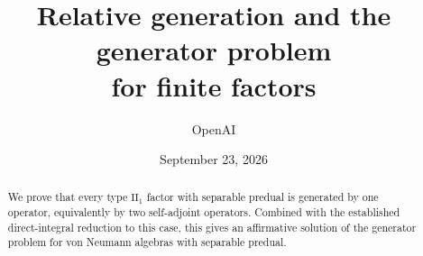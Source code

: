 \documentclass[11pt,letterpaper]{article}
\title{Relative generation and the generator problem\\for finite factors}
\author{OpenAI}
\date{September 23, 2026}
\begin{document}
\maketitle
\begin{abstract}
We prove that every type $\mathrm{II}_1$ factor with separable predual is
generated by one operator, equivalently by two self-adjoint operators.
Combined with the established direct-integral reduction to this case,
this gives an affirmative solution of the generator problem for von
Neumann algebras with separable predual.
\end{abstract}





\clearpage

\begingroup
\small
\raggedright

\endgroup
\end{document}
